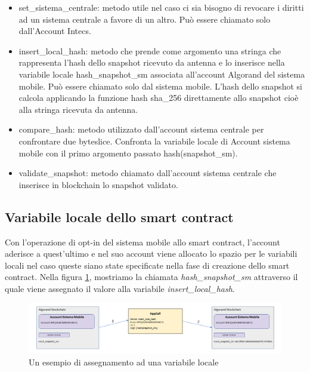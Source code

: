 \begin{itemize}
    \item set\_sistema\_centrale: metodo utile nel caso ci sia bisogno di revocare i diritti ad un sistema centrale a favore di un altro. Può essere chiamato solo dall’Account Intecs.
    \item insert\_local\_hash: metodo che prende come argomento una stringa che rappresenta l'hash dello snapshot ricevuto da antenna e lo inserisce nella variabile locale hash\_snapshot\_sm associata all'account Algorand del sistema mobile. Può essere chiamato solo dal sistema mobile. L'hash dello snapshot si calcola applicando la funzione hash sha\_256 \cite{gilbert2003security} direttamente allo snapshot cioè alla stringa ricevuta da antenna.
    \item compare\_hash: metodo utilizzato dall’account sistema centrale per confrontare due byteslice. Confronta la variabile locale di Account sistema mobile con il primo argomento passato hash(snapshot\_sm).
    \item validate\_snapshot: metodo chiamato dall’account sistema centrale che inserisce in blockchain lo snapshot validato.
\end{itemize}


\subsection{Variabile locale dello smart contract}
Con l'operazione di opt-in del sistema mobile allo smart contract, l'account aderisce a quest'ultimo e nel suo account viene allocato lo spazio per le variabili locali nel caso queste siano state specificate nella fase di creazione dello smart contract. Nella figura \ref{fig: statolocale}, mostriamo la chiamata \textit{hash\_snapshot\_sm} attraverso il quale viene assegnato il valore alla variabile \textit{insert\_local\_hash}.

\begin{figure}[!h]
\centering
\includegraphics[scale=0.5]{images/local_state.png}
\caption{Un esempio di assegnamento ad una variabile locale}
\label{fig: statolocale}
\end{figure}

